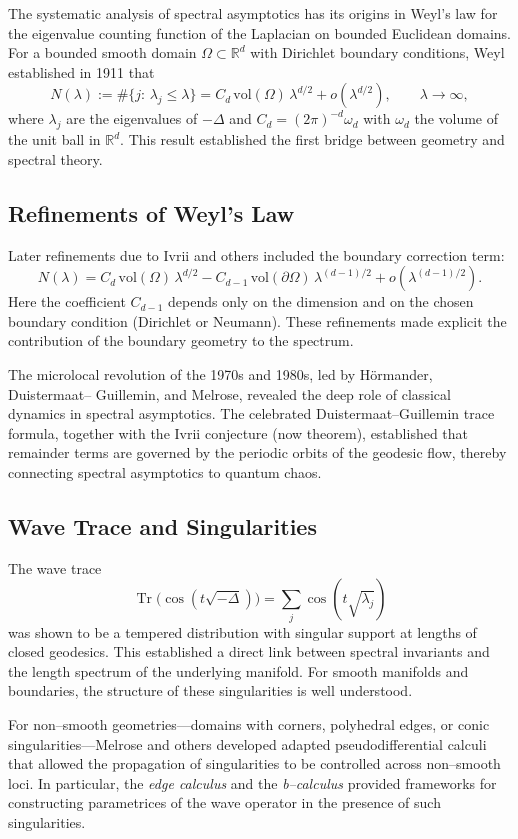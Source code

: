 The systematic analysis of spectral asymptotics has its origins in Weyl’s law 
for the eigenvalue counting function of the Laplacian on bounded Euclidean 
domains. For a bounded smooth domain $\Omega\subset\mathbb R^d$ with Dirichlet 
boundary conditions, Weyl established in 1911 that
\[
  N(\lambda) := \#\{j:\,\lambda_j\le \lambda\}
  = C_d\,\mathrm{vol}(\Omega)\,\lambda^{d/2} + o(\lambda^{d/2}),
  \qquad \lambda\to\infty,
\]
where $\lambda_j$ are the eigenvalues of $-\Delta$ and 
$C_d=(2\pi)^{-d}\omega_d$ with $\omega_d$ the volume of the unit ball in 
$\mathbb R^d$. This result established the first bridge between geometry and 
spectral theory.

\subsection{Refinements of Weyl’s Law}

Later refinements due to Ivrii and others included the boundary correction 
term:
\[
  N(\lambda) = C_d\,\mathrm{vol}(\Omega)\,\lambda^{d/2}
    - C_{d-1}\,\mathrm{vol}(\partial\Omega)\,\lambda^{(d-1)/2}
    + o(\lambda^{(d-1)/2}).
\]
Here the coefficient $C_{d-1}$ depends only on the dimension and on the chosen 
boundary condition (Dirichlet or Neumann). These refinements made explicit the 
contribution of the boundary geometry to the spectrum.

The microlocal revolution of the 1970s and 1980s, led by Hörmander, Duistermaat–
Guillemin, and Melrose, revealed the deep role of classical dynamics in spectral 
asymptotics. The celebrated Duistermaat–Guillemin trace formula, together with 
the Ivrii conjecture (now theorem), established that remainder terms are governed 
by the periodic orbits of the geodesic flow, thereby connecting spectral 
asymptotics to quantum chaos.

\subsection{Wave Trace and Singularities}

The wave trace
\[
  \operatorname{Tr}\big(\cos(t\sqrt{-\Delta})\big)
  = \sum_j \cos(t\sqrt{\lambda_j})
\]
was shown to be a tempered distribution with singular support at lengths of 
closed geodesics. This established a direct link between spectral invariants 
and the length spectrum of the underlying manifold. For smooth manifolds and 
boundaries, the structure of these singularities is well understood.

For non–smooth geometries—domains with corners, polyhedral edges, or conic 
singularities—Melrose and others developed adapted pseudodifferential calculi 
that allowed the propagation of singularities to be controlled across 
non–smooth loci. In particular, the \emph{edge calculus} and the \emph{b–calculus} 
provided frameworks for constructing parametrices of the wave operator in the 
presence of such singularities.

